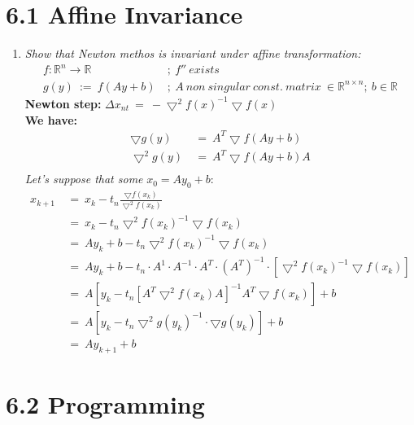 \documentclass{report}
\begin{document}
	\pagestyle{fancy}
	\hfill \\ \\
	
	\section*{6.1 Affine Invariance}
	\begin{enumerate}[]
		\item \textit{Show that Newton methos is invariant under affine transformation:}
		\begin{align*}
			f : \mathbb{R}^{n} \rightarrow \mathbb{R} \ & ; \ f'' \ exists \\
			g(y) \ := \ f(Ay+b) \ & ; \ A \ non \ singular \ const. \ matrix \  \in \mathbb{R}^{n \times n}; \ b \in \mathbb{R}
		\end{align*}
		\textbf{Newton step:} $\Delta x_{nt} \ = \ - \bigtriangledown ^{2} f(x) ^{-1} \bigtriangledown f(x)$ \\
		\textbf{We have:}
		\begin{align*}
			\bigtriangledown g(y) \ & = \ A^{T} \bigtriangledown f(Ay+b) \\
			\bigtriangledown ^{2} g(y) \ & = \ A^{T} \bigtriangledown f(Ay+b) A \\ 
		\end{align*}
		\textit{Let's suppose that some} $x_0 = A y_0 + b$:
		\begin{align*}
			x_{k+1} \ & = \ x_k - t_n \frac{\bigtriangledown f(x_k)}{\bigtriangledown ^{2} f(x_k)} \\
			& = \ x_k - t_n \bigtriangledown ^{2} f(x_k)^{-1}  \bigtriangledown f(x_k) \\
			& = \ Ay_k + b - t_n \bigtriangledown ^{2} f(x_k)^{-1}  \bigtriangledown f(x_k) \\
			& = \ Ay_k + b - t_n\cdot A^{1} \cdot A^{-1} \cdot A^{T} \cdot (A^{T})^{-1} \cdot [\bigtriangledown ^{2} f(x_k)^{-1}  \bigtriangledown f(x_k)] \\
			& = \ A [y_k - t_n [A^{T} \bigtriangledown ^{2} f(x_k) A] ^{-1} A^{T} \bigtriangledown f(x_k)] + b \\
			& = \ A [y_k - t_n \bigtriangledown ^{2} g(y_k)^{-1} \cdot \bigtriangledown g(y_k)] + b \\
			& = \ A y_{k+1} + b
		\end{align*}
	\end{enumerate}
	
	\section*{6.2 Programming}
		
\end{document}
